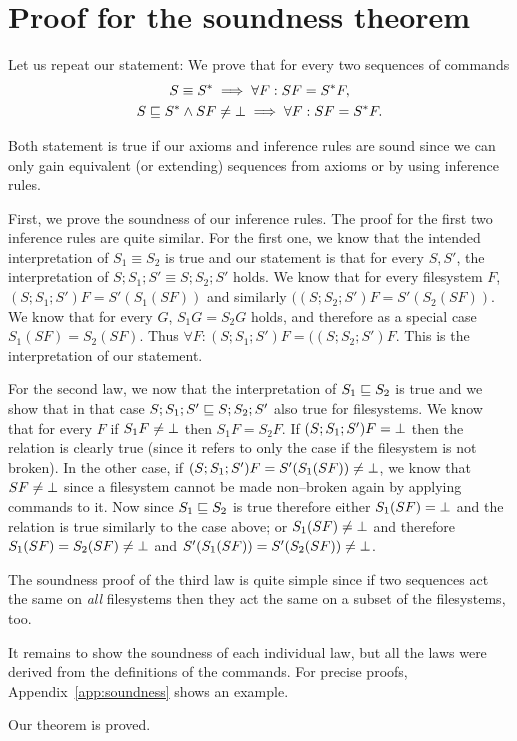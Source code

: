 \section{Proof for the soundness theorem}
\label{app:theosound}

Let us repeat our statement:
We prove that for every two sequences of commands 
\begin{gather*}
S\equiv S^* \implies \forall F: SF=S^*F,\\
S\eqexp S^*\wedge SF\ne\ud \implies \forall F: SF=S^*F.%
\end{gather*}

Both statement is true if our axioms and inference rules are sound since
we can only gain equivalent (or extending) sequences from axioms
or by using inference rules.

First, we prove the soundness of our inference rules. The proof for the
first two inference rules are quite similar. For the first one, we know
that the intended interpretation of \(S_1\equiv S_2\) is true and our
statement is that for every \(S,S'\), the interpretation of
\(S;S_1;S'\equiv S;S_2;S'\) holds. 
We know that for every filesystem
\(F\), \((S;S_1;S')F=S'(S_1(SF))\) and similarly
\(((S;S_2;S')F=S'(S_2(SF))\). We know that for every
\(G\), \(S_1G=S_2G\) holds, and therefore
as a special case \(S_1(SF)=S_2(SF)\). Thus
\(\forall F: (S;S_1;S')F=((S;S_2;S')F\). This is the interpretation of our
statement.

For the second law, we now that the interpretation of 
\(S_1\sqsubseteq S_2\) is true and we show that in that
case \(S;S_1;S'\sqsubseteq S;S_2;S'\) also true for filesystems. 
We know that for every \(F\) if \(S_1F\ne\bot\) then \(S_1F=S_2F\). If
\((S;S_1;S')F=\bot\) then the relation is clearly true (since it refers to
only the case if the filesystem is not broken). In the other case, if
\((S;S_1;S')F=S'(S_1(SF))\ne\bot\), we know that \(SF\ne\bot\) since
a filesystem cannot be made non--broken again by applying commands to it.
Now since \(S_1\sqsubseteq S_2\) is true therefore either 
\(S_1(SF)=\bot\) and the relation is true similarly to the case above;
or \(S_1(SF)\ne\bot\) and therefore
\(S_1(SF)=S_2(SF)\ne\bot\) and \(S'(S_1(SF))=S'(S_2(SF))\ne\bot\).

The soundness proof of the third law is quite simple since if two
sequences act the same on \emph{all} filesystems then they act the same on
a subset of the filesystems, too.

It remains to show the soundness of each individual law,
but all the laws were derived from the definitions of the
commands. For precise proofs,
Appendix~\ref{app:soundness} shows an example.

Our theorem is proved.

